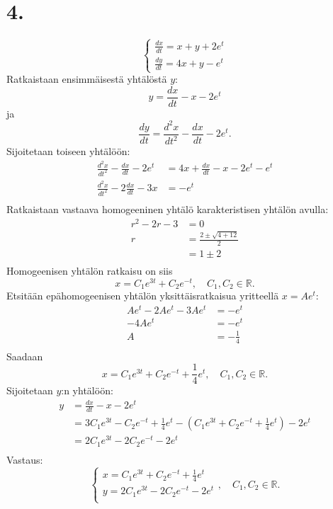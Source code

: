 \documentclass{article}
\begin{document}
\section*{4.}

\[
  \begin{cases}
    \frac{dx}{dt} = x + y + 2e^t \\
    \frac{dy}{dt} = 4x + y - e^t
  \end{cases}
\]
Ratkaistaan ensimmäisestä yhtälöstä $y$:
\[
  y = \frac{dx}{dt} - x - 2e^t
\]
ja
\[
  \frac{dy}{dt} = \frac{d^2 x}{d t^2} - \frac{dx}{dt} - 2e^t.
\]
Sijoitetaan toiseen yhtälöön:
\begin{align*}
  \frac{d^2 x}{d t^2} - \frac{dx}{dt} - 2e^t &= 4x + \frac{dx}{dt} - x - 2e^t - e^t \\
  \frac{d^2 x}{d t^2} - 2\frac{dx}{dt} - 3x &= -e^t \\
\end{align*}
Ratkaistaan vastaava homogeeninen yhtälö karakteristisen yhtälön avulla:
\begin{align*}
  r^2 - 2r - 3 &= 0 \\
  r &= \frac{2 \pm \sqrt{4 + 12}}{2} \\
    &= 1 \pm 2 \\
\end{align*}
Homogeenisen yhtälön ratkaisu on siis
\[
  x = C_1e^{3t} + C_2e^{-t}, \quad C_1,C_2 \in \mathbb{R}.
\]
Etsitään epähomogeenisen yhtälön yksittäisratkaisua yritteellä $x = Ae^t$:
\begin{align*}
  Ae^t - 2Ae^t - 3Ae^t &= -e^t \\
  -4Ae^t &= -e^t \\
  A &= -\frac{1}{4} \\
\end{align*}
Saadaan
\[
  x = C_1e^{3t} + C_2e^{-t} + \frac{1}{4}e^t, \quad C_1,C_2 \in \mathbb{R}.
\]
Sijoitetaan $y$:n yhtälöön:
\begin{align*}
  y &= \frac{dx}{dt} - x - 2e^t \\
    &= 3C_1e^{3t} - C_2e^{-t} + \frac{1}{4}e^t - (C_1e^{3t} + C_2e^{-t} + \frac{1}{4}e^t) - 2e^t \\
    &= 2C_1e^{3t} - 2C_2e^{-t} - 2e^t \\
\end{align*}
Vastaus:
\[
  \begin{cases}
    x = C_1e^{3t} + C_2e^{-t} + \frac{1}{4}e^t \\
    y = 2C_1e^{3t} - 2C_2e^{-t} - 2e^t \\
  \end{cases}, \quad C_1,C_2 \in \mathbb{R}.
\]
\end{document}
